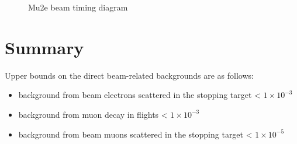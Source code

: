 \documentclass[12pt]{article}
\begin{document}
\begin{figure}[H]
  \caption{
    \label{fig:03160_flsh0s36b0_vdet_9_time}
    Mu2e beam timing diagram
  }
\end{figure}



\newpage
\section{Summary}
Upper bounds on the direct beam-related backgrounds are as follows:
\begin{itemize}
\item
  background from beam electrons scattered in the stopping target < $1 \times 10^{-3}$
\item
  background from muon decay in flights < $1 \times 10^{-3}$
\item
  background from beam muons scattered in the stopping target < $1 \times 10^{-5}$
\end{itemize}
%
\newpage


\end{document}
